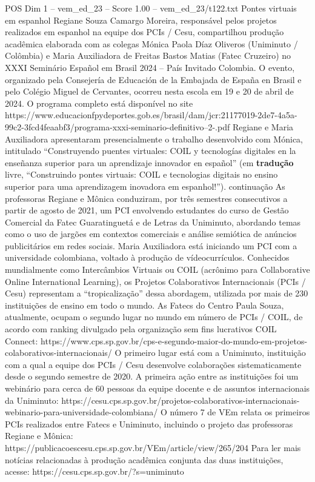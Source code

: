 \begin{textsample}{POS Dim 1 – vem\_ed\_23 – Score 1.00 – vem\_ed\_23/t122.txt}  \label{ex:f1_pos_016}
Pontes virtuais em espanhol Regiane Souza Camargo Moreira, responsável pelos projetos realizados em espanhol na equipe dos PCIs / Cesu, compartilhou produção acadêmica elaborada com as colegas Mónica Paola Díaz Oliveros (Uniminuto / Colômbia) e Maria Auxiliadora de Freitas Bastos Matias (Fatec Cruzeiro) no XXXI Seminário Español em Brasil 2024 – País Invitado Colombia.
O evento, organizado pela Consejería de Educación de la Embajada de España en Brasil e pelo Colégio Miguel de Cervantes, ocorreu nesta escola em 19 e 20 de abril de 2024.
O programa completo está disponível no site https://www.educacionfpydeportes.gob.es/brasil/dam/jcr:21177019-2de7-4a5a-99c2-3fcd4feaabf3/programa-xxxi-seminario-definitivo--2-.pdf Regiane e Maria Auxiliadora apresentaram presencialmente o trabalho desenvolvido com Mónica, intitulado “Construyendo puentes virtuales: COIL y tecnologías digitales en la enseñanza superior para un aprendizaje innovador en español” (em \textbf{tradução} livre, “Construindo pontes virtuais: COIL e tecnologias digitais no ensino superior para uma aprendizagem inovadora em espanhol!”). continuação As professoras Regiane e Mônica conduziram, por três semestres consecutivos a partir de agosto de 2021, um PCI envolvendo estudantes do curso de Gestão Comercial da Fatec Guaratinguetá e de Letras da Uniminuto, abordando temas como o uso de jargões em contextos comerciais e análise semiótica de anúncios publicitários em redes sociais.
Maria Auxiliadora está iniciando um PCI com a universidade colombiana, voltado à produção de vídeocurrículos.
Conhecidos mundialmente como Intercâmbios Virtuais ou COIL (acrônimo para Collaborative Online International Learning), os Projetos Colaborativos Internacionais (PCIs / Cesu) representam a “tropicalização” dessa abordagem, utilizada por mais de 230 instituições de ensino em todo o mundo.
As Fatecs do Centro Paula Souza, atualmente, ocupam o segundo lugar no mundo em número de PCIs / COIL, de acordo com ranking divulgado pela organização sem fins lucrativos COIL Connect: https://www.cps.sp.gov.br/cps-e-segundo-maior-do-mundo-em-projetos-colaborativos-internacionais/ O primeiro lugar está com a Uniminuto, instituição com a qual a equipe dos PCIs / Cesu desenvolve colaborações sistematicamente desde o segundo semestre de 2020.
A primeira ação entre as instituições foi um webinário para cerca de 60 pessoas da equipe docente e de assuntos internacionais da Uniminuto: https://cesu.cps.sp.gov.br/projetos-colaborativos-internacionais-webinario-para-universidade-colombiana/ O número 7 de VEm relata os primeiros PCIs realizados entre Fatecs e Uniminuto, incluindo o projeto das professoras Regiane e Mônica: https://publicacoescesu.cps.sp.gov.br/VEm/article/view/265/204 Para ler mais notícias relacionadas à produção acadêmica conjunta das duas instituições, acesse: https://cesu.cps.sp.gov.br/?s=uniminuto

\end{textsample}
